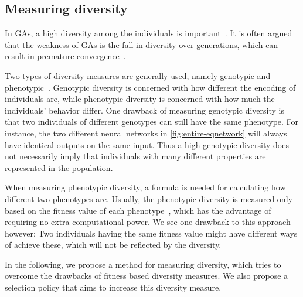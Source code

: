 \subsection{Measuring diversity}
In GAs, a high diversity among the individuals is important~\cite{1266373, Zitzler00comparisonof}. It is often argued that the weakness of GAs is the fall in diversity over generations, which can result in premature convergence~\cite{diaz2007empirical}.

Two types of diversity measures are generally used, namely genotypic and phenotypic~\cite{Nguyen:2006:ASPGP}. Genotypic diversity is concerned with how different the encoding of individuals are, while phenotypic diversity is concerned with how much the individuals' behavior differ. One drawback of measuring genotypic diversity is that two individuals of different genotypes can still have the same phenotype. For instance, the two different neural networks in \cref{fig:entire-eqnetwork} will always have identical outputs on the same input. Thus a high genotypic diversity does not necessarily imply that individuals with many different properties are represented in the population.
%

%
When measuring phenotypic diversity, a formula is needed for calculating how different two phenotypes are.
Usually, the phenotypic diversity is measured only based on the fitness value of each phenotype~\cite{Nguyen:2006:ASPGP}, which has the advantage of requiring no extra computational power. 
We see one drawback to this approach however; Two individuals having the same fitness value might have different ways of achieve these, which will not be reflected by the diversity. 

In the following, we propose a method for measuring diversity, which tries to overcome the drawbacks of fitness based diversity measures. We also propose a selection policy that aims to increase this diversity measure.
